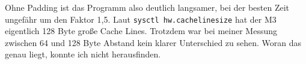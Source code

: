 \documentclass[11pt]{article}
\begin{document}
Ohne Padding ist das Programm also deutlich langsamer, bei der besten Zeit ungefähr um den Faktor
1,5. Laut \texttt{sysctl hw.cachelinesize} hat der M3 eigentlich 128 Byte große Cache Lines.
Trotzdem war bei meiner Messung zwischen 64 und 128 Byte Abstand kein klarer Unterschied zu
sehen. Woran das genau liegt, konnte ich nicht herausfinden.
\end{document}
